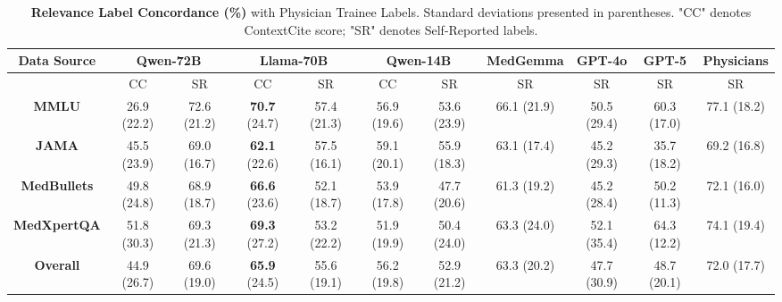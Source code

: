 \documentclass[11pt]{article}
\begin{document}
\begin{table}[h!]
  \centering
  {\scriptsize
  \begin{tabular}{c|c|c|c|c|c|c|c|c|c|c} 
    \toprule
    \textbf{Data Source} & \multicolumn{2}{c|}{\textbf{Qwen-72B}} & \multicolumn{2}{c|}{\textbf{Llama-70B}} & \multicolumn{2}{c|}{\textbf{Qwen-14B}} & \textbf{MedGemma} & \textbf{GPT-4o} & \textbf{GPT-5} & \textbf{Physicians}\\
    \midrule
                & CC  & SR & CC & SR & CC  & SR & SR & SR & SR & SR\\
    \midrule
    \textbf{MMLU}       & 26.9 {\tiny(22.2)}  & 72.6 {\tiny(21.2)}   & \textbf{70.7} {\tiny(24.7)} & 57.4 {\tiny(21.3)}  &  56.9 {\tiny(19.6)}  & 53.6 {\tiny(23.9)}  & 66.1 {\tiny(21.9)}  & 50.5 {\tiny(29.4)} & 60.3 {\tiny(17.0)} & 77.1 {\tiny(18.2)}\\
    \textbf{JAMA}       & 45.5 {\tiny(23.9)}  & 69.0 {\tiny(16.7)}   & \textbf{62.1} {\tiny(22.6)} & 57.5 {\tiny(16.1)} & 59.1 {\tiny(20.1)}  & 55.9 {\tiny(18.3)}  & 63.1 {\tiny(17.4)} & 45.2 {\tiny(29.3)} & 35.7 {\tiny(18.2)} & 69.2 {\tiny(16.8)}\\
    \textbf{MedBullets} & 49.8 {\tiny(24.8)}  & 68.9 {\tiny(18.7)}   & \textbf{66.6} {\tiny(23.6)} & 52.1 {\tiny(18.7)} & 53.9 {\tiny(17.8)}  & 47.7 {\tiny(20.6)}  & 61.3 {\tiny(19.2)}  & 45.2 {\tiny(28.4)} & 50.2 {\tiny(11.3)} & 72.1 {\tiny(16.0)} \\
    \textbf{MedXpertQA} & 51.8 {\tiny(30.3)}  & 69.3 {\tiny(21.3)}   & \textbf{69.3} {\tiny(27.2)} & 53.2 {\tiny(22.2)} & 51.9 {\tiny(19.9)}  & 50.4 {\tiny(24.0)}  & 63.3 {\tiny(24.0)}  & 52.1 {\tiny(35.4)} & 64.3 {\tiny(12.2)} & 74.1 {\tiny(19.4)} \\ 
    \midrule
    \textbf{Overall}    & 44.9 {\tiny(26.7)}  & 69.6 {\tiny(19.0)}   & \textbf{65.9} {\tiny(24.5)} & 55.6 {\tiny(19.1)} & 56.2 {\tiny(19.8)}  & 52.9 {\tiny(21.2)}  & 63.3 {\tiny(20.2)}  & 47.7 {\tiny(30.9)} & 48.7 {\tiny(20.1)} & 72.0 {\tiny(17.7)}\\
    \bottomrule
  \end{tabular}
  }
  \caption{\textbf{Relevance Label Concordance (\%)} with Physician Trainee Labels. Standard deviations presented in parentheses. "CC" denotes ContextCite score; "SR" denotes Self-Reported labels.}
  \label{concordance}
\end{table}

\end{document}
